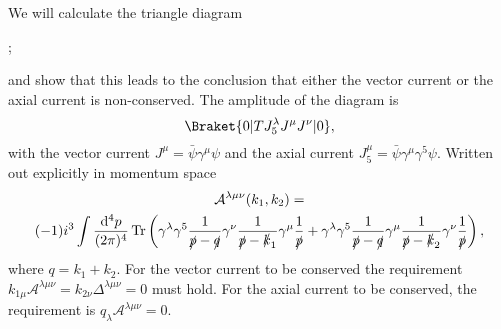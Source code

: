 We will calculate the triangle diagram
\begin{center}
  \nocite{ellisTikZFeynmanFeynmanDiagrams2017}
  ;
\end{center}
and show that this leads to the conclusion that either the vector current or the axial current is non-conserved.
The amplitude of the diagram is
\begin{equation}
  \Braket{0|
    T J_5^{\lambda} J^{\mu} J^{\nu}|
  0},
\end{equation}
with the vector current $J^{\mu }= \bar{\psi} \gamma ^{\mu } \psi $ and the axial current $J_5^{\mu } = \bar{\psi} \gamma ^{\mu } \gamma ^5\psi $.
Written out explicitly in momentum space
\begin{multline}
  \label{eq:amplitude}
  \mathcal{A}^{\lambda \mu \nu}(k_1, k_2) =\\
  (-1) i^3 \int \frac{\mathrm{d}^4p}{(2 \pi)^{4}}
  \operatorname{Tr}\left(
    \gamma^{\lambda}\gamma^5 \frac{1}{\slashed{p} - \slashed{q}}
    \gamma^{\nu} \frac{1}{\slashed{p} - \slashed{k}_{1}}
    \gamma ^{\mu} \frac{1}{\slashed{p}}
    +
    \gamma ^{\lambda}\gamma^5 \frac{1}{\slashed{p} - \slashed{q}}
    \gamma ^{\mu } \frac{1}{\slashed{p} -\slashed{k}_{2}}
    \gamma ^{\nu } \frac{1}{\slashed{p}}
  \right),
\end{multline}
where $q = k_1 + k_2$.
For the vector current to be conserved the requirement $k_{1\mu }\mathcal{A} ^{\lambda \mu \nu } = k_{2\nu }\Delta ^{\lambda \mu \nu } = 0$ must hold.
For the axial current to be conserved, the requirement is $q_{\lambda }\mathcal{A}^{\lambda \mu \nu } = 0$.

